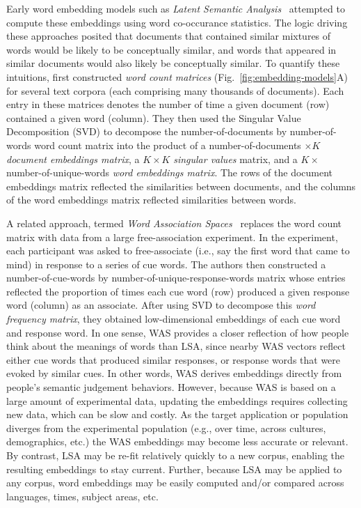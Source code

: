\documentclass{article}
\begin{document}
Early word embedding models such as \textit{Latent Semantic Analysis}~\citep[LSA;][]{LandDuma97} attempted to compute these embeddings using word co-occurance statistics.  The logic driving these approaches posited that documents that contained similar mixtures of words would be likely to be conceptually similar, and words that appeared in similar documents would also likely be conceptually similar.  To quantify these intuitions, \cite{LandDuma97} first constructed \textit{word count matrices} (Fig.~\ref{fig:embedding-models}A) for several text corpora (each comprising many thousands of documents).  Each entry in these matrices denotes the number of time a given document (row) contained a given word (column).  They then used the Singular Value Decomposition (SVD) to decompose the number-of-documents by number-of-words word count matrix into the product of a number-of-documents $\times K$ \textit{document embeddings matrix}, a $K \times K$ \textit{singular values} matrix, and a $K \times $ number-of-unique-words \textit{word embeddings matrix}.  The rows of the document embeddings matrix reflected the similarities between documents, and the columns of the word embeddings matrix reflected similarities between words.

A related approach, termed \textit{Word Association Spaces}~\citep[WAS;][]{NelsEtal04, SteyEtal04} replaces the word count matrix with data from a large free-association experiment.  In the experiment, each participant was asked to free-associate (i.e., say the first word that came to mind) in response to a series of cue words.  The authors then constructed a number-of-cue-words by number-of-unique-response-words matrix whose entries reflected the proportion of times each cue word (row) produced a given response word (column) as an associate.  After using SVD to decompose this \textit{word frequency matrix}, they obtained low-dimensional embeddings of each cue word and response word.  In one sense, WAS provides a closer reflection of how people think about the meanings of words than LSA, since nearby WAS vectors reflect either cue words that produced similar responses, or response words that were evoked by similar cues.  In other words, WAS derives embeddings directly from people's semantic judgement behaviors.  However, because WAS is based on a large amount of experimental data, updating the embeddings requires collecting new data, which can be slow and costly.  As the target application or population diverges from the experimental population (e.g., over time, across cultures, demographics, etc.) the WAS embeddings may become less accurate or relevant.  By contrast, LSA may be re-fit relatively quickly to a new corpus, enabling the resulting embeddings to stay current.  Further, because LSA may be applied to any corpus, word embeddings may be easily computed and/or compared across languages, times, subject areas, etc.
\end{document}
